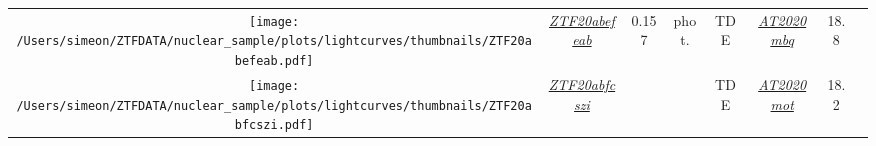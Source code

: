 \begin{table*}
{\begin{tabular}{c c  c  c  c   c  c  c}
      \parbox[c]{12em}{\texttt{[image: /Users/simeon/ZTFDATA/nuclear\_sample/plots/lightcurves/thumbnails/ZTF20abefeab.pdf]}}                                                                                                                                   & \textit{\href{https://ztfnuclear.simeonreusch.com/transient/ZTF20abefeab}{ZTF20abefeab}}          & 0.157                    & phot.                   & TDE               &
      \textit{\href{https://www.wis-tns.org/object/2020mbq}{AT2020mbq}}                                                                           & 18.8                                                                                              &                                                                                                                                                 \\
      \parbox[c]{12em}{\texttt{[image: /Users/simeon/ZTFDATA/nuclear\_sample/plots/lightcurves/thumbnails/ZTF20abfcszi.pdf]}}                                                                                                                                   & \textit{\href{https://ztfnuclear.simeonreusch.com/transient/ZTF20abfcszi}{ZTF20abfcszi}}          & ~                        & ~                       & TDE               &
      \textit{\href{https://www.wis-tns.org/object/2020mot}{AT2020mot}}                                                                           & 18.2                                                                                              &                                                                                                                                                 \\
    \end{tabular}}
\end{table*}

